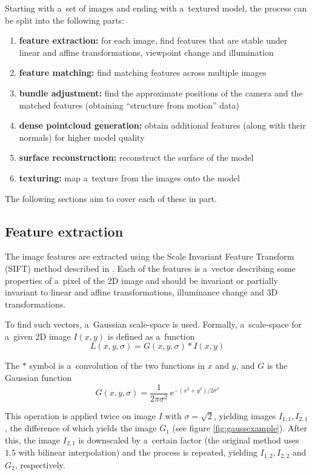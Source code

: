 Starting with a~set of images and ending with a~textured model, the process can be split into the following parts:

\begin{enumerate}
	\item \textbf{feature extraction:} for each image, find features that are stable under linear and affine transformations, viewpoint change and illumination
	\item \textbf{feature matching:} find matching features across multiple images
	\item \textbf{bundle adjustment:} find the approximate positions of the camera and the matched features (obtaining ``structure from motion'' data)
	\item \textbf{dense pointcloud generation:} obtain additional features (along with their normals) for higher model quality
	\item \textbf{surface reconstruction:} reconstruct the surface of the model
	\item \textbf{texturing:} map a~texture from the images onto the model
\end{enumerate}

The following sections aim to cover each of these in part.

\subsection{Feature extraction} \label{ch:fext}
The image features are extracted using the Scale Invariant Feature Transform (SIFT) method described in \citet{lowe1999object,lowe2004distinctive}.
Each of the features is a~vector describing some properties of a~pixel of the 2D image and should be invariant or partially invariant to linear and affine transformations, illuminance change and 3D transformations.

To find such vectors, a~Gaussian scale-space is used.
Formally, a~scale-space for a~given 2D image $I(x, y)$ is defined as a~function
\begin{equation} L(x, y, \sigma) = G(x, y, \sigma) * I(x, y) \end{equation}

The $*$ symbol is a~convolution of the two functions in $x$ and $y$, and $G$ is the Gaussian function
\begin{equation}G(x, y, \sigma) = \frac{1}{2\pi \sigma^2}\ \mathrm{e}^{-(x^2 + y^2) / 2\sigma^2}\end{equation}

This operation is applied twice on image $I$ with $\sigma = \sqrt{2}$, yielding images $I_{1,1}, I_{2,1}$, the difference of which yields the image $G_1$ (see figure \ref{fig:gaussexample}).
After this, the image $I_{2,1}$ is downscaled by a~certain factor (the original method uses $1.5$ with bilinear interpolation) and the process is repeated, yielding $I_{1,2}, I_{2,2}$ and $G_2$, respectively.

